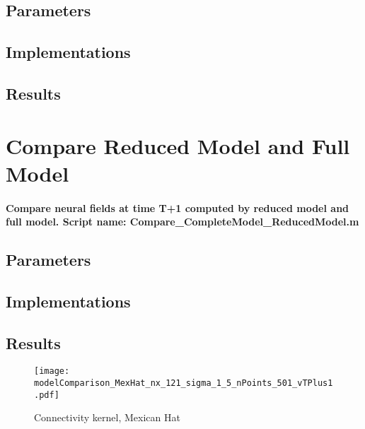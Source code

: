 \documentclass[a4paper, 12pt, english]{article}
\begin{document}
\subsection{Parameters}
\subsection{Implementations}
\subsection{Results}
\newpage


\section{Compare Reduced Model and Full Model}
\paragraph{Compare neural fields at time T+1 computed by reduced model and full model.\newline
Script name: Compare\_CompleteModel\_ReducedModel.m}
\subsection{Parameters}
\subsection{Implementations}
\subsection{Results}


\begin{figure}[H]
\centering
\texttt{[image: modelComparison\_MexHat\_nx\_121\_sigma\_1\_5\_nPoints\_501\_vTPlus1.pdf]}
\caption{Connectivity kernel, Mexican Hat}
\end{figure}
\end{document}
